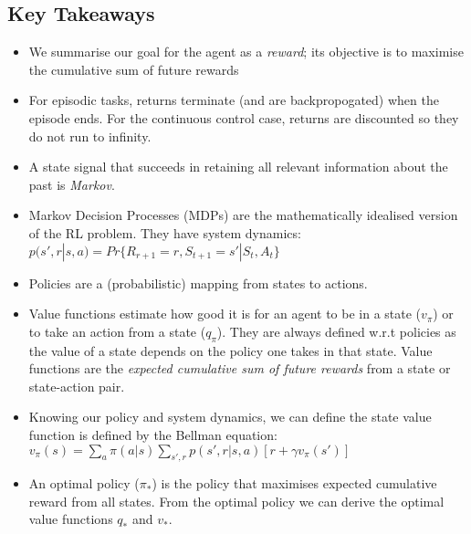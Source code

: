 \subsection{Key Takeaways}
\begin{itemize}
\item We summarise our goal for the agent as a \textit{reward}; its objective is to maximise the cumulative sum of future rewards
\item For episodic tasks, returns terminate (and are backpropogated) when the episode ends. For the continuous control case, returns are discounted so they do not run to infinity. 
\item A state signal that succeeds in retaining all relevant information about the past is \textit{Markov}. 
\item Markov Decision Processes (MDPs) are the mathematically idealised version of the RL problem. They have system dynamics: $p(s', r | s, a) = Pr \{R_{r+1} = r, S_{t+1} = s' | S_t, A_t\}$
\item Policies are a (probabilistic) mapping from states to actions.
\item Value functions estimate how good it is for an agent to be in a state ($v_\pi$) or to take an action from a state ($q_\pi$). They are always defined w.r.t policies as the value of a state depends on the policy one takes in that state. Value functions are the \textit{expected cumulative sum of future rewards} from a state or state-action pair.
\item Knowing our policy and system dynamics, we can define the state value function is defined by the Bellman equation: $v_\pi(s) = \sum_{a} \pi(a|s) \sum_{s',r} p(s', r | s, a) \left[r + \gamma v_\pi(s')\right]$
\item An optimal policy ($\pi_*$) is the policy that maximises expected cumulative reward from all states. From the optimal policy we can derive the optimal value functions $q_*$ and $v_*$.
\end{itemize}










